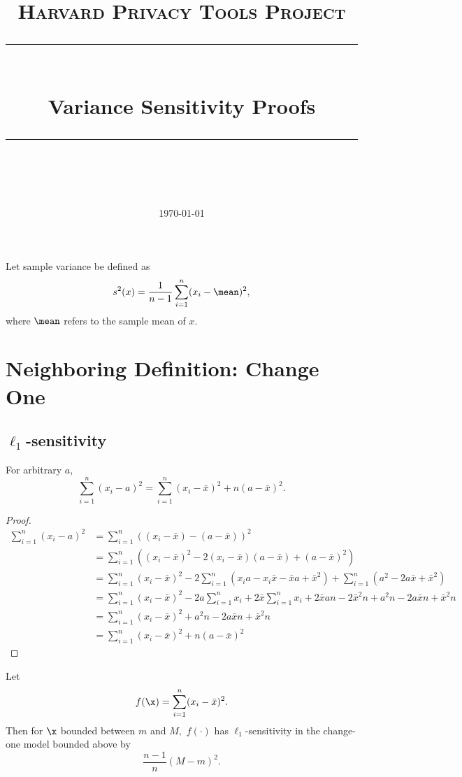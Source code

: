 \documentclass[11pt]{scrartcl} %
\title{
	\normalfont\normalsize
	\textsc{Harvard Privacy Tools Project}\\ %
	\vspace{25pt} %
	\rule{\linewidth}{0.5pt}\\ %
	\vspace{20pt} %
	{\huge Variance Sensitivity Proofs}\\ %
	\vspace{12pt} %
	\rule{\linewidth}{2pt}\\ %
	\vspace{12pt} %
}
\date{\normalsize\today} %
\begin{document}
\maketitle

\begin{definition}
Let sample variance be defined as
$$ s^2(x) = \frac{1}{n-1} \sum_{i=1}^n (x_i - \mean)^2,$$
where $\mean$ refers to the sample mean of $x$.
\end{definition}

\section{Neighboring Definition: Change One}
\subsection{$\ell_1$-sensitivity}
\begin{lemma}
\label{lemma:meansum}
For arbitrary $a$,
$$ \sum_{i=1}^n (x_i - a)^2 = \sum_{i=1}^n (x_i - \bar{x})^2 + n(a-\bar{x})^2.$$
\end{lemma}

\begin{proof}
\begin{align*}
\sum_{i=1}^n (x_i - a)^2 &= \sum_{i=1}^n \left( (x_i - \bar{x}) - (a-\bar{x}) \right)^2\\
	&= \sum_{i=1}^n \left( (x_i - \bar{x})^2 -2(x_i - \bar{x})(a-\bar{x}) + (a-\bar{x})^2\right)\\
	&= \sum_{i=1}^n (x_i - \bar{x})^2 - 2\sum_{i=1}^n \left(x_ia-x_i\bar{x} -\bar{x}a + \bar{x}^2\right) + \sum_{i=1}^n \left( a^2 -2a\bar{x} + \bar{x}^2\right)\\
	&=  \sum_{i=1}^n (x_i - \bar{x})^2 -2a\sum_{i=1}^n x_i + 2\bar{x}\sum_{i=1}^n x_i + 2\bar{x}an - 2\bar{x}^2n + a^2n-2a\bar{x}n+\bar{x}^2n\\
	&=  \sum_{i=1}^n (x_i - \bar{x})^2 + a^2n-2a\bar{x}n+\bar{x}^2n\\
	&=  \sum_{i=1}^n (x_i - \bar{x})^2 + n(a-\bar{x})^2
\end{align*}

\end{proof}

\begin{theorem}
Let
$$ f(\x) = \sum_{i=1}^n (x_i - \bar{x})^2.$$
Then for $\x$ bounded between $m$ and $M,$ $f(\cdot)$ has $\ell_1$-sensitivity in the change-one model bounded above by
$$\frac{n-1}{n} (M-m)^2.$$
\end{theorem}
\end{document}
